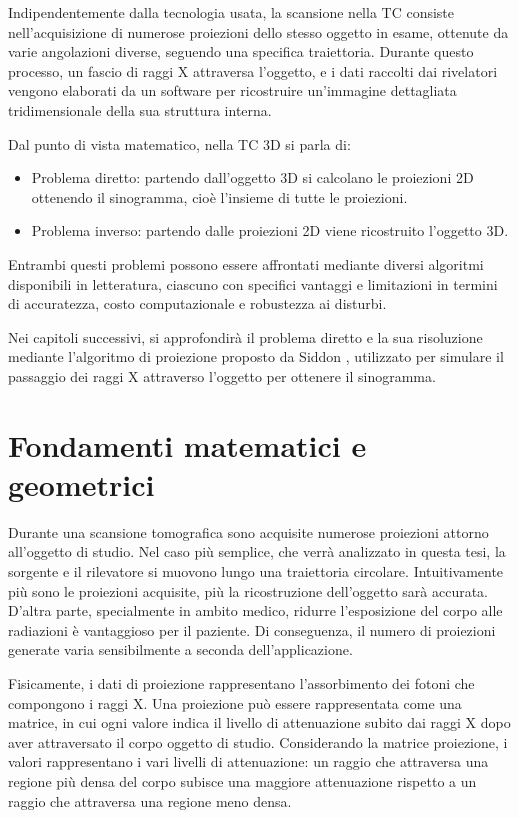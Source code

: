 \documentclass[12pt,a4paper]{report}
\begin{document}
Indipendentemente dalla tecnologia usata, la scansione nella TC consiste nell'acquisizione di numerose proiezioni dello stesso
oggetto in esame, ottenute da varie angolazioni diverse, seguendo una specifica traiettoria.
Durante questo processo, un fascio di raggi X attraversa l'oggetto, e i dati raccolti dai rivelatori vengono elaborati da un
software per ricostruire un'immagine dettagliata tridimensionale della sua struttura interna.

Dal punto di vista matematico, nella TC 3D si parla di:
\begin{itemize}
  \item Problema diretto: partendo dall'oggetto 3D si calcolano le proiezioni 2D ottenendo il sinogramma, cioè l'insieme di tutte
        le proiezioni.
  \item Problema inverso: partendo dalle proiezioni 2D viene ricostruito l'oggetto 3D.
\end{itemize}

Entrambi questi problemi possono essere affrontati mediante diversi algoritmi disponibili in letteratura, ciascuno con specifici
vantaggi e limitazioni in termini di accuratezza, costo computazionale e robustezza ai disturbi.

Nei capitoli successivi, si approfondirà il problema diretto e la sua risoluzione mediante l'algoritmo di proiezione proposto da
Siddon \cite{Siddon1984}, utilizzato per simulare il passaggio dei raggi X attraverso l'oggetto per ottenere il sinogramma.

\chapter{Fondamenti matematici e geometrici} \label{chap:math}

Durante una scansione tomografica sono acquisite numerose proiezioni attorno all'oggetto di studio.
Nel caso più semplice, che verrà analizzato in questa tesi, la sorgente e il rilevatore si muovono lungo una traiettoria
circolare.
Intuitivamente più sono le proiezioni acquisite, più la ricostruzione dell'oggetto sarà accurata.
D'altra parte, specialmente in ambito medico, ridurre l'esposizione del corpo alle radiazioni è vantaggioso per il paziente.
Di conseguenza, il numero di proiezioni generate varia sensibilmente a seconda dell'applicazione.

Fisicamente, i dati di proiezione rappresentano l'assorbimento dei fotoni che compongono i raggi X.
Una proiezione può essere rappresentata come una matrice, in cui ogni valore indica il livello di attenuazione subito dai raggi X
dopo aver attraversato il corpo oggetto di studio.
Considerando la matrice proiezione, i valori rappresentano i vari livelli di attenuazione: un raggio che attraversa una regione
più densa del corpo subisce una maggiore attenuazione rispetto a un raggio che attraversa una regione meno densa.
\end{document}
